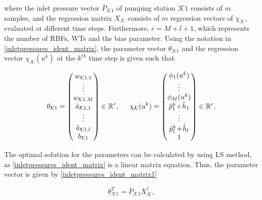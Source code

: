 where the inlet pressure vector $\bar{P}_{\mathcal{K}1}$ of pumping station $\mathcal{K}1$ consists of $m$ samples, and the regression matrix $X_{\mathcal{K}}$ consists of $m$ regression vectors of $\chi_{\mathcal{K}}$, evaluated at different time steps. Furthermore, $r = M \!+\! l\! +\! 1$, which represents the number of RBFs, WTs and the bias parameter. Using the notation in \eqref{inletpressures_ident_matrix}, the parameter vector $\theta_{\mathcal{K}1}$ and the regression vector $\chi_{\mathcal{K}}(u^k)$  at the $k^{th}$ time step is given such that

  \begin{equation}
\label{par_regr_matrix}
\theta_{\mathcal{K}1} = 
          \begin{pmatrix}
           w_{\mathcal{K}1,1}  \\
           \vdots  \\
           w_{\mathcal{K}1,M}  \\
           \tilde{a}_{\mathcal{K}1,1} \\
           \vdots \\
           \tilde{a}_{\mathcal{K}1,l} \\
           b_{\mathcal{K}1} \\
         \end{pmatrix} \in  \mathbb{R}^{r},
         \hspace{5mm}
         \chi_{\mathcal{K}}(u^k) = 
         \begin{pmatrix}
           \phi_{1}(u^k)  \\
           \vdots  \\
           \phi_{M}(u^k)  \\
           \hat{p}^k_{1} \!+ \!\hat{h}_{1} \\
           \vdots  \\
           \hat{p}^k_{l} \!+ \!\hat{h}_{l} \\
           1 \\
         \end{pmatrix}\in  \mathbb{R}^{r}.
\end{equation}

The optimal solution for the parameters can be calculated by using LS method, as \eqref{inletpressures_ident_matrix} is a linear matrix equation. Thus, the parameter vector is given by \eqref{inletpressures_ident_matrix1}

\begin{equation}
\label{inletpressures_ident_matrix1}
 \theta^T_{\mathcal{K}1} = \bar{P}_{\mathcal{K}1} X_{\mathcal{K}}^{\dagger}, 
\end{equation}

